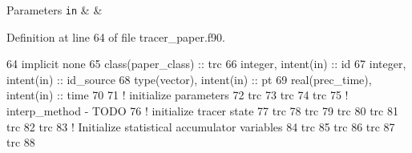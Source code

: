 \begin{DoxyParams}[1]{Parameters}
\mbox{\tt in}  & {\em } & \\
\hline
\end{DoxyParams}


Definition at line 64 of file tracer\+\_\+paper.\+f90.


\begin{DoxyCode}
64     \textcolor{keywordtype}{implicit none}
65     \textcolor{keywordtype}{class}(paper\_class) :: trc
66     \textcolor{keywordtype}{integer}, \textcolor{keywordtype}{intent(in)} :: id
67     \textcolor{keywordtype}{integer}, \textcolor{keywordtype}{intent(in)} :: id\_source
68     \textcolor{keywordtype}{type}(vector), \textcolor{keywordtype}{intent(in)} :: pt
69     \textcolor{keywordtype}{real(prec\_time)}, \textcolor{keywordtype}{intent(in)} :: time
70 
71     \textcolor{comment}{! initialize parameters}
72     trc%
73     trc%
74     trc%
75     \textcolor{comment}{! interp\_method - TODO}
76     \textcolor{comment}{! initialize tracer state}
77     trc%
78     trc%
79     trc%
80     trc%
81     trc%
82     trc%
83     \textcolor{comment}{! Initialize statistical accumulator variables}
84     trc%
85     trc%
86     trc%
87     trc%
88 
\end{DoxyCode}
